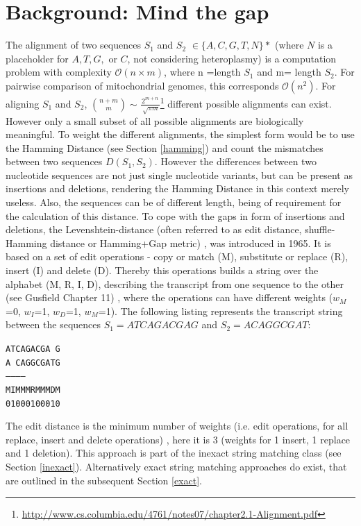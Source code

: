 \section{Background: Mind the gap}
The alignment of two sequences $S_1$ and $S_2$ $\in \{A,C,G,T,N\}*$ (where $N$ is a placeholder for $A, T, G,$ or $C$, not considering heteroplasmy) is a computation problem with complexity $\mathcal{O}(n \times m)$, where n =length $S_1$ and m= length $S_2$. For pairwise comparison of mitochondrial genomes, this corresponds $\mathcal{O}({n}^{2})$. For aligning $S_1$ and $S_2$, $\binom{n+m}{m} \sim \frac{ {2}^{m  + n}}{\sqrt[]{\pi m}}$\footnote{\url{http://www.cs.columbia.edu/4761/notes07/chapter2.1-Alignment.pdf}} different possible alignments can exist. However only a small subset of all possible alignments are biologically meaningful. To weight the different alignments, the simplest form would be to use the Hamming Distance (see Section \ref{hamming}) and count the mismatches between two sequences $D(S_1,S_2)$. However the differences between two nucleotide sequences are not just single nucleotide variants, but can be present as insertions and deletions, rendering the Hamming Distance in this context merely useless. Also, the sequences can be of different length, being of requirement for the calculation of this distance. To cope with the gaps in form of insertions and deletions, the Levenshtein-distance (often referred to as edit distance, shuffle-Hamming distance or Hamming+Gap metric) \cite{Deza2009}, was introduced in 1965. It is based on a set of edit operations - copy or match (M), substitute or replace (R), insert (I) and delete (D). Thereby this operations builds a string over the alphabet (M, R, I, D), describing the transcript from one sequence to the other (see Gusfield Chapter 11) \cite{Gusfield1997}, where the operations can have different weights ($w_M$=0, $w_I$=1, $w_D$=1, $w_M$=1). The following listing represents the transcript string between the sequences $S_1 = ATCAGACGAG$ and $S_2 = ACAGGCGAT$:
\begin{center}
\texttt{ATCAGACGA G} \\
\texttt{A CAGGCGATG} \\
\texttt{-----------} \\
\texttt{MIMMMRMMMDM} \\
\texttt{01000100010} \\
\end{center}
The edit distance is the minimum number of weights (i.e. edit operations, for all replace, insert and delete operations) \cite{Gusfield1997}, here it is 3 (weights for 1 insert, 1 replace and 1 deletion). This approach is part of the inexact string matching class (see Section \ref{inexact}). Alternatively exact string matching approaches do exist, that are outlined in the subsequent Section \ref{exact}. 

